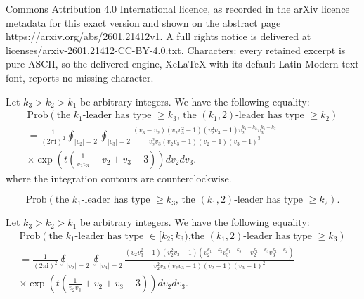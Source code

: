 \documentclass[10pt,a4paper]{amsart}
\newcommand{\ii}{{\mathbf i}}
\renewcommand\ge{\geq}
\begin{document}
Commons Attribution 4.0 International licence, as recorded in the arXiv licence metadata for this exact version and shown on the abstract page https://arxiv.org/abs/2601.21412v1. A full rights notice is delivered at licenses/arxiv-2601.21412-CC-BY-4.0.txt. Characters: every retained excerpt is pure ASCII, so the delivered engine, XeLaTeX with its default Latin Modern text font, reports no missing character.
	\begin{prop}
		\label{prop:2leaders-1}
		Let $k_3 >k_2 > k_1$ be arbitrary integers. We have the following equality:
		\begin{multline}
			\label{eq:prop2leaders1}
			\mathrm{Prob} \left( \mbox{the $k_1$-leader has type $\ge k_3$, } \mbox{the $(k_1, 2)$-leader has type $\ge k_2$} \right)
			\\ =
			\frac{1}{(2 \pi \ii)^2} \oint_{|v_2|=2} \oint_{|v_3|=2} \frac{(v_3-v_2)(v_2 v_3^2-1)(v_2^2 v_3-1) v_2^{k_1-k_2} v_3^{k_1-k_3}}{ v_2^2 v_3 (v_2 v_3-1) (v_2-1) (v_3-1)^3 } \\ \times \exp \left( t \left( \frac{1}{v_2 v_3} + v_2 + v_3 - 3 \right) \right) d v_2 d v_3.
		\end{multline}
		where the integration contours are counterclockwise.
	\end{prop}

		\begin{equation}
			\label{eq:asymp2joint1}
			\mathrm{Prob} \left( \mbox{the $k_1$-leader has type $\ge k_3$, } \mbox{the $(k_1, 2)$-leader has type $\ge k_2$} \right).
		\end{equation}

	\begin{prop}
		\label{prop:2leaders-2}
		Let $k_3 > k_2 >k_1$ be arbitrary integers. We have the following equality:
		\begin{multline*}
			\mathrm{Prob} \left( \mbox{the $k_1$-leader has type $\in [k_2;k_3)$,} \mbox{the $(k_1, 2)$-leader has type $\ge k_3$} \right) 
			\\ = \frac{1}{(2 \pi \ii)^2} \oint_{|v_2|=2} \oint_{|v_3|=2} \frac{(v_2 v_3^2-1)(v_2^2 v_3-1) \left( v_2^{k_1-k_2} v_3^{k_1-k_3} - v_2^{k_1-k_3} v_3^{k_1-k_2} \right) }{ v_2^2 v_3 (v_2 v_3-1) (v_2-1) (v_3-1)^2 } \\ \times \exp \left( t \left( \frac{1}{v_2 v_3} + v_2 + v_3 - 3 \right) \right) d v_2 d v_3.
		\end{multline*}
		
	\end{prop}
\end{document}
